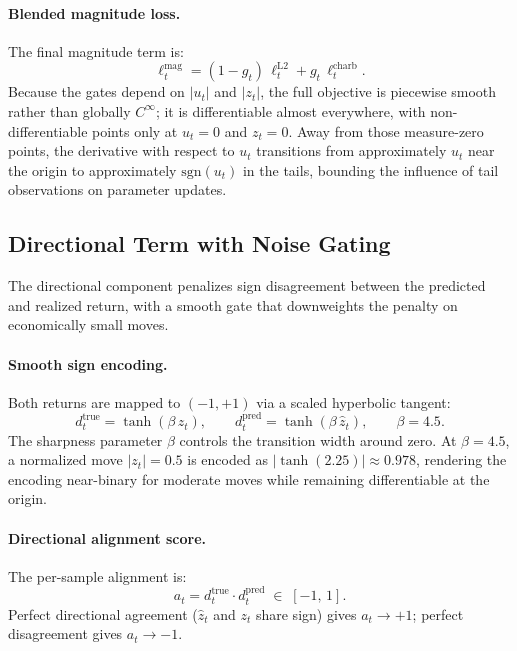 \documentclass[11pt]{article}
\begin{document}
\paragraph{Blended magnitude loss.}
The final magnitude term is:
\begin{equation}
  \ell_t^{\mathrm{mag}}
  = (1 - g_t)\,\ell_t^{\mathrm{L2}}
  + g_t\,\ell_t^{\mathrm{charb}}.
  \label{eq:mag-loss}
\end{equation}
Because the gates depend on $|u_t|$ and $|z_t|$, the full objective
is piecewise smooth rather than globally $C^\infty$; it is
differentiable almost everywhere, with non-differentiable points only
at $u_t = 0$ and $z_t = 0$. Away from those measure-zero points,
the derivative with respect to $u_t$ transitions from approximately
$u_t$ near the origin to approximately $\mathrm{sgn}(u_t)$ in the
tails, bounding the influence of tail observations on parameter
updates.

\subsection{Directional Term with Noise Gating}
\label{ssec:directional}

The directional component penalizes sign disagreement between the
predicted and realized return, with a smooth gate that downweights
the penalty on economically small moves.

\paragraph{Smooth sign encoding.}
Both returns are mapped to $(-1, +1)$ via a scaled hyperbolic tangent:
\begin{equation}
  d_t^{\mathrm{true}} = \tanh(\beta\,z_t),
  \qquad
  d_t^{\mathrm{pred}} = \tanh(\beta\,\hat{z}_t),
  \qquad
  \beta = 4.5.
  \label{eq:tanh-sign}
\end{equation}
The sharpness parameter $\beta$ controls the transition width around
zero. At $\beta = 4.5$, a normalized move $|z_t| = 0.5$ is encoded
as $|\tanh(2.25)| \approx 0.978$, rendering the encoding near-binary
for moderate moves while remaining differentiable at the origin.

\paragraph{Directional alignment score.}
The per-sample alignment is:
\begin{equation}
  a_t
  = d_t^{\mathrm{true}} \cdot d_t^{\mathrm{pred}}
  \;\in\; [-1,\,1].
  \label{eq:dir-score}
\end{equation}
Perfect directional agreement ($\hat{z}_t$ and $z_t$ share sign)
gives $a_t \to +1$; perfect disagreement gives $a_t \to -1$.
\end{document}
